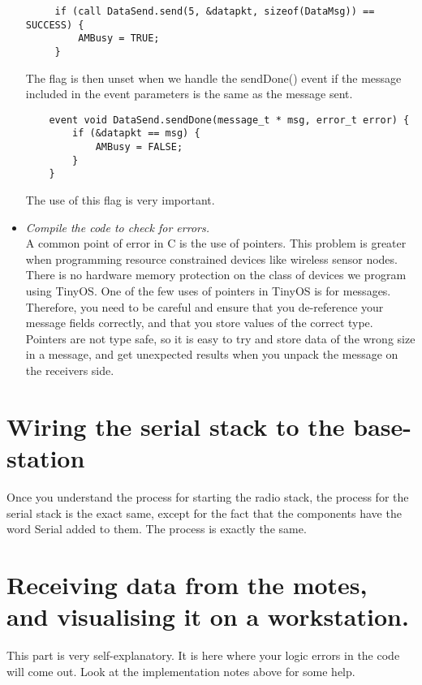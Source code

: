 \documentclass [a4] {article}
\begin{document}
\begin{itemize}
\begin{verbatim}
     if (call DataSend.send(5, &datapkt, sizeof(DataMsg)) == SUCCESS) {
         AMBusy = TRUE;
     }
\end{verbatim}

The flag is then unset when we handle the sendDone() event if the message included in the event parameters is the same as the message sent. 

\begin{verbatim}
    event void DataSend.sendDone(message_t * msg, error_t error) {
        if (&datapkt == msg) {
            AMBusy = FALSE;
        }
    }
\end{verbatim}

The use of this flag is very important.

\item \textit{Compile the code to check for errors.}
\linebreak
\\
A common point of error in C is the use of pointers. This problem is greater when programming resource constrained devices like wireless sensor nodes. There is no hardware memory protection on the class of devices we program using TinyOS. One of the few uses of pointers in TinyOS is for messages. Therefore, you need to be careful and ensure that you de-reference your message fields correctly, and that you store values of the correct type. Pointers are not type safe, so it is easy to try and store data of the wrong size in a message, and get unexpected results when you unpack the message on the receivers side.

\end{itemize}

\section{Wiring the serial stack to the base-station}

Once you understand the process for starting the radio stack, the process for the serial stack is the exact same, except for the fact that the components have the word Serial added to them. The process is exactly the same.


\section{Receiving data from the motes, and visualising it on a workstation.}

This part is very self-explanatory. It is here where your logic errors in the code will come out. Look at the implementation notes above for some help.
\end{document}
